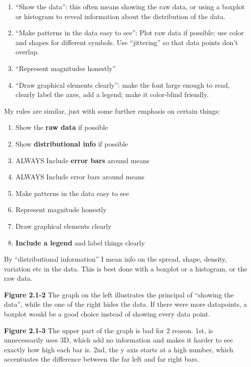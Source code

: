 \documentclass[]{book}
\providecommand{\tightlist}{%
  \setlength{\itemsep}{0pt}\setlength{\parskip}{0pt}}
\theoremstyle{definition}
\theoremstyle{definition}
\theoremstyle{definition}
\theoremstyle{remark}
\begin{document}
\begin{enumerate}
\def\labelenumi{\arabic{enumi}.}
\tightlist
\item
  ``Show the data'': this often means showing the raw data, or using a
  boxplot or histogram to reveal information about the distribution of
  the data.
\item
  ``Make patterns in the data easy to see'': Plot raw data if possible;
  use color and shapes for different symbols. Use ``jittering'' so that
  data points don't overlap.
\item
  ``Represent magnitudes honestly''
\item
  ``Draw graphical elements clearly'': make the font large enough to
  read, clearly label the axes, add a legend; make it color-blind
  friendly.
\end{enumerate}

My rules are similar, just with some further emphasis on certain things:

\begin{enumerate}
\def\labelenumi{\arabic{enumi}.}
\tightlist
\item
  Show the \textbf{raw data} if possible
\item
  Show \textbf{distributional info} if possible
\item
  ALWAYS Include \textbf{error bars} around means
\item
  ALWAYS Include error bars around means
\item
  Make patterns in the data easy to see
\item
  Represent magnitude honestly
\item
  Draw graphical elements clearly
\item
  \textbf{Include a legend} and label things clearly
\end{enumerate}

By ``distributional information'' I mean info on the spread, shape,
density, variation etc in the data. This is best done with a boxplot or
a histogram, or the raw data.

\textbf{Figure 2.1-2} The graph on the left illustrates the principal of
``showing the data'', while the one of the right hides the data. If
there were more datapoints, a boxplot would be a good choice instead of
showing every data point.

\textbf{Figure 2.1-3} The upper part of the graph is bad for 2 reason.
1st, is unnecessarily uses 3D, which add no information and makes it
harder to see exactly how high each bar is. 2nd, the y axis starts at a
high number, which accentuates the difference between the far left and
far right bars.
\end{document}

